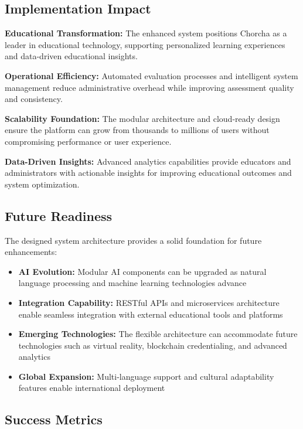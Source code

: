 \documentclass[12pt,a4paper,oneside]{book}
\begin{document}
\subsection{Implementation Impact}

\textbf{Educational Transformation:} The enhanced system positions Chorcha as a leader in educational technology, supporting personalized learning experiences and data-driven educational insights.

\textbf{Operational Efficiency:} Automated evaluation processes and intelligent system management reduce administrative overhead while improving assessment quality and consistency.

\textbf{Scalability Foundation:} The modular architecture and cloud-ready design ensure the platform can grow from thousands to millions of users without compromising performance or user experience.

\textbf{Data-Driven Insights:} Advanced analytics capabilities provide educators and administrators with actionable insights for improving educational outcomes and system optimization.

\subsection{Future Readiness}

The designed system architecture provides a solid foundation for future enhancements:

\begin{itemize}
    \item \textbf{AI Evolution:} Modular AI components can be upgraded as natural language processing and machine learning technologies advance
    \item \textbf{Integration Capability:} RESTful APIs and microservices architecture enable seamless integration with external educational tools and platforms
    \item \textbf{Emerging Technologies:} The flexible architecture can accommodate future technologies such as virtual reality, blockchain credentialing, and advanced analytics
    \item \textbf{Global Expansion:} Multi-language support and cultural adaptability features enable international deployment
\end{itemize}

\subsection{Success Metrics}
\end{document}
